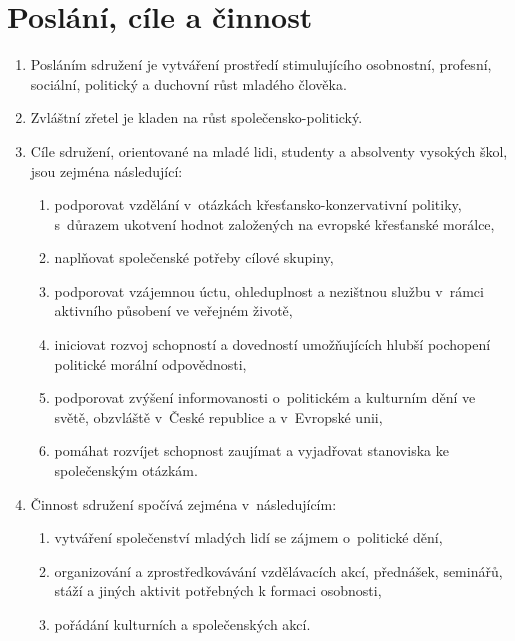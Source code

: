 \documentclass[a4paper]{article}
\begin{document}
\section{Poslání, cíle a činnost}
    \begin{enumerate}
    \item Posláním sdružení je vytváření prostředí stimulujícího osobnostní,
        profesní, sociální, politický a duchovní růst mladého člověka.

    \item Zvláštní zřetel je kladen na růst společensko-politický.

    \item Cíle sdružení, orientované na mladé lidi, studenty a absolventy
        vysokých škol, jsou zejména následující:
        \begin{enumerate}
            \item podporovat vzdělání v~otázkách křesťansko-konzervativní
                politiky, s~důrazem ukotvení hodnot založených na evropské
                křesťanské morálce,

            \item naplňovat společenské potřeby cílové skupiny,

            \item podporovat vzájemnou úctu, ohleduplnost a nezištnou službu
                v~rámci aktivního působení ve veřejném životě,

            \item iniciovat rozvoj schopností a dovedností umožňujících hlubší
                pochopení politické morální odpovědnosti,

            \item podporovat zvýšení informovanosti o~politickém a kulturním
                dění ve světě, obzvláště v~České republice a v~Evropské unii,

            \item pomáhat rozvíjet schopnost zaujímat a vyjadřovat stanoviska
                ke společenským otázkám.
        \end{enumerate}

    \item Činnost sdružení spočívá zejména v~následujícím:
        \begin{enumerate}
        \item vytváření společenství mladých lidí se zájmem o~politické dění,

        \item organizování a zprostředkovávání vzdělávacích akcí, přednášek,
            seminářů, stáží a jiných aktivit potřebných k formaci osobnosti,

        \item pořádání kulturních a společenských akcí.
        \end{enumerate}
    \end{enumerate}
\end{document}
